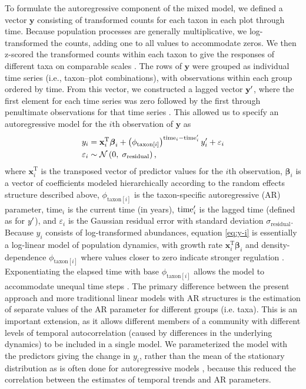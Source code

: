 To formulate the autoregressive component of the mixed model, we defined a vector $\mathbf{y}$
consisting of transformed counts for each taxon in each plot through time.
Because population processes are generally multiplicative, we log-transformed the counts,
adding one to all values to accommodate zeros.
We then z-scored the
transformed counts within each taxon to give the responses of different taxa on
comparable scales \citep{Jackson2012}.
The rows of $\mathbf{y}$ were grouped as individual time series
(i.e., taxon--plot combinations), with observations within each group ordered by time.
From this vector, we constructed a lagged vector $\mathbf{y\sp{\prime}}$,
where the first element for each time series was zero followed by the first through
penultimate observations for that time series \citep{Ives2006}.
This allowed us to specify an autoregressive model for the $i$th observation of
$\mathbf{y}$ as
%
\begin{equation} \label{eq:y-i}
\begin{split}
    y_i &= \mathbf{x}_i^\text{T} {\boldsymbol\beta}_i +
        \left( \phi_{\text{taxon}[i]} \right)^{\text{time}_i - \text{time}\sp{\prime}_i}
        y\sp{\prime}_i + \varepsilon_i \\
    \varepsilon_i &\sim \mathcal{N} \left(0, \; \sigma_{\text{residual}} \right)
    \text{,}
\end{split}
\end{equation}
%
\noindent where $\mathbf{x}_i^\text{T}$ is the transposed vector
of predictor values for the $i$th observation,
${\boldsymbol\beta}_i$ is a vector of coefficients 
modeled hierarchically according to the random effects structure described above,
$\phi_{\text{taxon}[i]}$ is the taxon-specific autoregressive (AR) parameter,
$\text{time}_i$ is the current time (in years),
$\text{time}\sp{\prime}_i$ is the lagged time (defined as for  $y\sp{\prime}$),
and $\varepsilon_i$  is the Gaussian residual
error with standard deviation $\sigma_{\text{residual}}$.
Because $y_i$ consists of log-transformed abundances, equation \ref{eq:y-i} is
essentially a log-linear model of population dynamics, with growth rate
$\mathbf{x}_i^\text{T} {\boldsymbol\beta}_i$ and
density-dependence $\phi_{\text{taxon}[i]}$
where values closer to zero indicate stronger regulation \citep{Ives2010, Ziebarth2010}.
Exponentiating the elapsed time with base $\phi_{\text{taxon}[i]}$ allows the model
to accommodate unequal time steps \citep{Zuur2009}.
The primary difference between the present approach and more traditional linear models
with AR structures \citep[e.g.][]{Zuur2009} is the estimation of separate values of the AR
parameter for different groups (i.e. taxa).
This is an important extension, as it allows different members of a community with
different levels of temporal autocorrelation (caused by differences in the underlying
dynamics) to be included in a single model.
We parameterized the model with the predictors giving the change in $y_i$,
rather than the mean of the stationary distribution as is often done
for autoregressive models \citep{Harvey1990, Ives2006},
because this reduced the correlation between the estimates of temporal trends and AR parameters.



